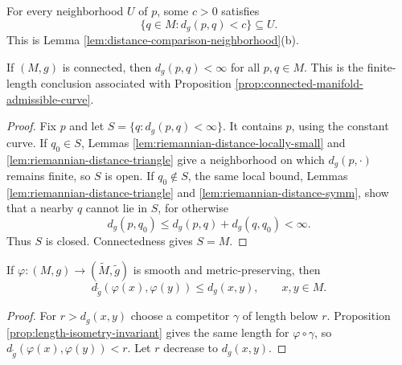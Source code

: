 \begin{lemma}
\label{lem:riemannian-distance-small-implies-nearby}




For every neighborhood $U$ of $p$, some $c>0$ satisfies
\[
\{q\in M:d_g(p,q)<c\}\subseteq U.
\]
This is Lemma \ref{lem:distance-comparison-neighborhood}(b).
\end{lemma}

\begin{proposition}
\label{prop:riemannian-distance-finite}





If $(M,g)$ is connected, then $d_g(p,q)<\infty$ for all $p,q\in M$. This is the finite-length conclusion associated with Proposition \ref{prop:connected-manifold-admissible-curve}.
\end{proposition}
\begin{proof}

\sketch Fix $p$ and let $S=\{q:d_g(p,q)<\infty\}$. It contains $p$, using the constant curve. If $q_0\in S$, Lemmas \ref{lem:riemannian-distance-locally-small} and \ref{lem:riemannian-distance-triangle} give a neighborhood on which $d_g(p,\cdot)$ remains finite, so $S$ is open. If $q_0\notin S$, the same local bound, Lemmas \ref{lem:riemannian-distance-triangle} and \ref{lem:riemannian-distance-symm}, show that a nearby $q$ cannot lie in $S$, for otherwise
\[
d_g(p,q_0)\le d_g(p,q)+d_g(q,q_0)<\infty.
\]
Thus $S$ is closed. Connectedness gives $S=M$.
\end{proof}

\begin{lemma}
\label{lem:metric-preserving-distance-le}





If $\varphi:(M,g)\to(\widetilde M,\widetilde g)$ is smooth and metric-preserving, then
\[
d_{\widetilde g}(\varphi(x),\varphi(y))\le d_g(x,y),
\qquad x,y\in M.
\]
\end{lemma}
\begin{proof}

\sketch For $r>d_g(x,y)$ choose a competitor $\gamma$ of length below $r$. Proposition \ref{prop:length-isometry-invariant} gives the same length for $\varphi\circ\gamma$, so $d_{\widetilde g}(\varphi(x),\varphi(y))<r$. Let $r$ decrease to $d_g(x,y)$.
\end{proof}

